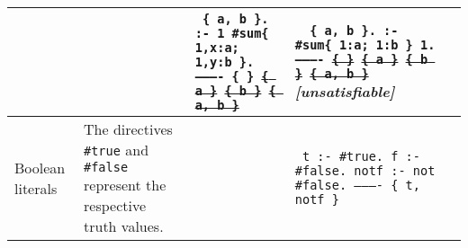 \documentclass[9pt,a4paper,landscape]{article}
\begin{document}
{\begin{longtable}{Lp{14.5cm}lXX}
&&\texttt{%
	{\footnotesize
		\{ a, b \}. \newline	
		:- 1 \#sum\{ 1,x:a; 1,y:b \}. \newline
		---------- \newline
		\{ \} \newline
		\sout{\{ a \}} \newline
		\sout{\{ b \}} \newline
		\sout{\{ a, b \}} }}
& \texttt{%
	{\footnotesize
		\{ a, b \}. \newline	
		:- \#sum\{ 1:a; 1:b \} 1. \newline
		---------- \newline
		\sout{\{ \}} \newline
		\sout{\{ a \}} \newline
		\sout{\{ b \}} \newline
		\sout{\{ a, b \}} } } \newline
\textit{[unsatisfiable]}\\ \midrule

Boolean literals
& The directives \texttt{\#true} and \texttt{\#false} represent the respective truth values.
&& \texttt{%
	t :- \#true. \newline
	f :- \#false. \newline
	notf :- not \#false. \newline
	---------- \newline				
	\{ t, notf \} } &\\ \midrule


\end{longtable}}
\end{document}
